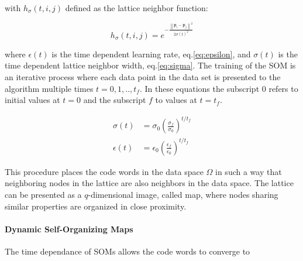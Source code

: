 with $h_\sigma(t,i,j)$ defined as the lattice neighbor function:

\begin{equation}
h_\sigma(t,i,j) = e^{-\frac{\left\lVert \boldsymbol{p}_i - \boldsymbol{p}_j \right\rVert^2}{2\sigma(t)^2}}
\end{equation}

where $\epsilon(t)$ is the time dependent learning rate, eq.\eqref{eq:epsilon}, and $\sigma(t)$ is the time dependent lattice neighbor width, eq.\eqref{eq:sigma}. The training of the SOM is an iterative process where each data point in the data set is presented to the algorithm multiple times $t={0, 1,..,t_f}$. In these equations the subscript $0$ refers to initial values at $t=0$ and the subscript $f$ to values at $t=t_f$.

\begin{align}
\sigma(t) & = \sigma_0 \left(\frac{\sigma_f}{\sigma_0}\right)^{t/t_f} \label{eq:sigma} \\
\epsilon(t) & = \epsilon_0 \left(\frac{\epsilon_f}{\epsilon_0}\right)^{t/t_f} \label{eq:epsilon}
\end{align}

This procedure places the code words in the data space $\Omega$ in such a way that neighboring nodes in the lattice are also neighbors in the data space. The lattice can be presented as a $q$-dimensional image, called map, where nodes sharing similar properties are organized in close proximity.

\paragraph{Dynamic Self-Organizing Maps}
The time dependance of SOMs allows the code words to converge to 